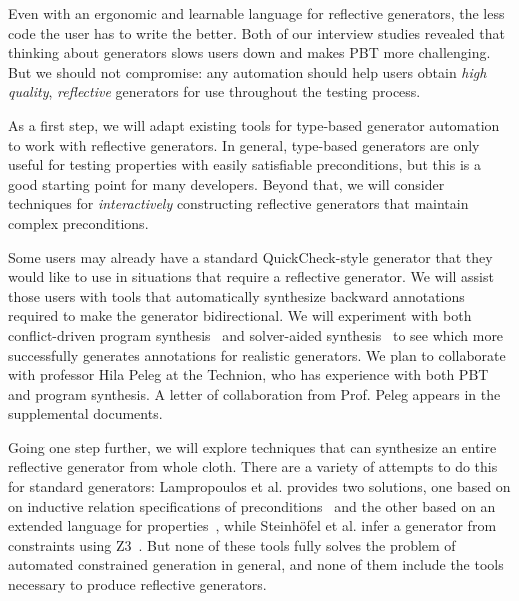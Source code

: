 
%
Even with an ergonomic and learnable language for reflective generators, the
less code the user has to write the better. Both of our interview studies
revealed
that thinking about generators slows users down and makes PBT more challenging.
But we should not compromise: any automation should help users obtain {\em high
quality}, {\em reflective} generators for use throughout the testing process.

As a first step, we will adapt existing tools for type-based generator
automation~\cite{mista2019deriving} to work with reflective generators.
In general, type-based
generators are only useful for testing properties with easily satisfiable
preconditions, but this is a good starting point for many developers. Beyond
that, we will consider techniques for {\em interactively}
constructing reflective generators that maintain complex preconditions.

Some users may already have a standard QuickCheck-style generator that
they would like to use
in situations that require a reflective generator. We will assist those
users with tools that automatically synthesize backward annotations
required to make the generator bidirectional. We will experiment with both
conflict-driven program synthesis~\cite{feng_program_2018} and solver-aided
synthesis~\cite{torlak_growing_2013} to see which more successfully generates
annotations for realistic generators.
We plan to collaborate with professor Hila
Peleg at the Technion, who has experience with both PBT and program synthesis. A
letter of collaboration from Prof.{} Peleg appears in the supplemental documents.

Going one step further, we will explore techniques that can synthesize an
entire reflective generator from whole cloth. There are a variety of
attempts to do this for standard generators: Lampropoulos et al. provides
two solutions, one based on on inductive relation specifications of
preconditions~\cite{Lampropoulos&18} and the other based on an
extended language for properties~\cite{beginners-luck}, while Steinh\"ofel et al.
infer a generator from constraints using
Z3~\cite{steinhofel_input_2022,de_moura_z3_2008}.
But none of these
tools fully solves the problem of automated constrained generation in
general, and none of them include the tools necessary to produce reflective
generators.

